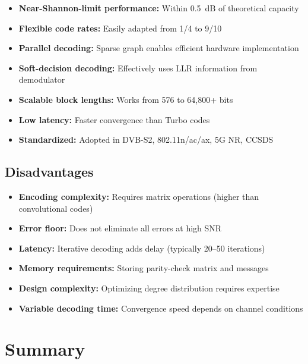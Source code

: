 \begin{itemize}
\item \textbf{Near-Shannon-limit performance:} Within 0.5~dB of theoretical capacity
\item \textbf{Flexible code rates:} Easily adapted from 1/4 to 9/10
\item \textbf{Parallel decoding:} Sparse graph enables efficient hardware implementation
\item \textbf{Soft-decision decoding:} Effectively uses LLR information from demodulator
\item \textbf{Scalable block lengths:} Works from 576 to 64,800+ bits
\item \textbf{Low latency:} Faster convergence than Turbo codes
\item \textbf{Standardized:} Adopted in DVB-S2, 802.11n/ac/ax, 5G NR, CCSDS
\end{itemize}

\subsection{Disadvantages}

\begin{itemize}
\item \textbf{Encoding complexity:} Requires matrix operations (higher than convolutional codes)
\item \textbf{Error floor:} Does not eliminate all errors at high SNR
\item \textbf{Latency:} Iterative decoding adds delay (typically 20--50 iterations)
\item \textbf{Memory requirements:} Storing parity-check matrix and messages
\item \textbf{Design complexity:} Optimizing degree distribution requires expertise
\item \textbf{Variable decoding time:} Convergence speed depends on channel conditions
\end{itemize}

\section{Summary}

